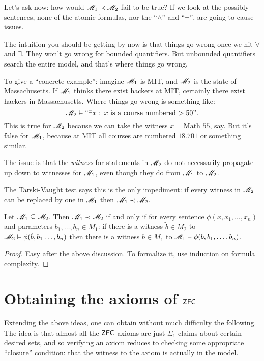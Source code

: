 Let's ask now: how would $\mathscr M_1 \prec \mathscr M_2$ fail to be true?
If we look at the possibly sentences, none of the atomic formulas,
nor the ``$\land$'' and ``$\neg$'', are going to cause issues.

The intuition you should be getting by now is that things go
wrong once we hit $\forall$ and $\exists$.
They won't go wrong for bounded quantifiers.
But unbounded quantifiers search the entire model, and that's where things go wrong.

To give a ``concrete example'':
imagine $\mathscr M_1$ is MIT, and $\mathscr M_2$ is the state of Massachusetts.
If $\mathscr M_1$ thinks there exist hackers at MIT,
certainly there exist hackers in Massachusetts.
Where things go wrong is something like:
\[ \mathscr M_2 \vDash \text{``$\exists x$ : $x$ is a course numbered $> 50$''}. \]
This is true for $\mathscr M_2$ because we can take the witness $x = \text{Math 55}$, say.
But it's false for $\mathscr M_1$, because at MIT all courses are numbered $18.701$ or something similar.
\begin{moral}
	The issue is that the \emph{witness}
	for statements in $\mathscr M_2$ do not necessarily propagate up
	down to witnesses for $\mathscr M_1$, even though they do from $\mathscr M_1$ to $\mathscr M_2$.
\end{moral}

The Tarski-Vaught test says this is the only impediment:
if every witness in $\mathscr M_2$ can be replaced by one in $\mathscr M_1$ then $\mathscr M_1 \prec \mathscr M_2$.
\begin{lemma}
	Let $\mathscr M_1 \subseteq \mathscr M_2$.
	Then $\mathscr M_1 \prec \mathscr M_2$ if and only if for
	every sentence $\phi(x, x_1, \dots, x_n)$ and parameters $b_1, \dots, b_n \in M_1$:
	if there is a witness $\tilde b \in M_2$ to $\mathscr M_2 \vDash \phi(\tilde b, b_1 \dots, b_n)$
	then there is a witness $b \in M_1$ to $\mathscr M_1 \vDash \phi(b, b_1, \dots, b_n)$.
\end{lemma}
\begin{proof}
	Easy after the above discussion.
	To formalize it, use induction on formula complexity.
\end{proof}

\section{Obtaining the axioms of $\mathsf{ZFC}$}
Extending the above ideas, one can obtain without much difficulty the following.
The idea is that almost all the $\mathsf{ZFC}$ axioms are just $\Sigma_1$ claims about certain desired sets,
and so verifying an axiom reduces to checking some appropriate ``closure'' condition:
that the witness to the axiom is actually in the model.

